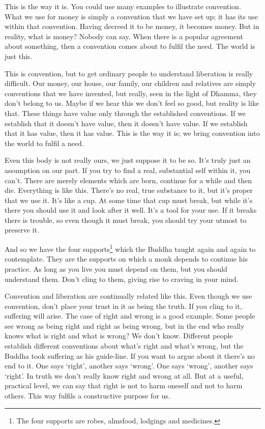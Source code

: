 This is the way it is. You could use many examples to illustrate convention. What we use for money is simply a convention that we have set up; it has its use within that convention. Having decreed it to be money, it becomes money. But in reality, what is money? Nobody can say. When there is a popular agreement about something, then a convention comes about to fulfil the need. The world is just this. 

This is convention, but to get ordinary people to understand liberation is really difficult. Our money, our house, our family, our children and relatives are simply conventions that we have invented, but really, seen in the light of Dhamma, they don't belong to us. Maybe if we hear this we don't feel so good, but reality is like that. These things have value only through the established conventions. If we establish that it doesn't have value, then it doesn't have value. If we establish that it has value, then it has value. This is the way it is; we bring convention into the world to fulfil a need. 

Even this body is not really ours, we just suppose it to be so. It's truly just an assumption on our part. If you try to find a real, substantial self within it, you can't. There are merely elements which are born, continue for a while and then die. Everything is like this. There's no real, true substance to it, but it's proper that we use it. It's like a cup. At some time that cup must break, but while it's there you should use it and look after it well. It's a tool for your use. If it breaks there is trouble, so even though it must break, you should try your utmost to preserve it. 

And so we have the four supports\footnote{The four supports are robes, almsfood, lodgings and medicines.} which the Buddha taught again and again to contemplate. They are the supports on which a monk depends to continue his practice. As long as you live you must depend on them, but you should understand them. Don't cling to them, giving rise to craving in your mind. 

Convention and liberation are continually related like this. Even though we use convention, don't place your trust in it as being the truth. If you cling to it, suffering will arise. The case of right and wrong is a good example. Some people see wrong as being right and right as being wrong, but in the end who really knows what is right and what is wrong? We don't know. Different people establish different conventions about what's right and what's wrong, but the Buddha took suffering as his guide-line. If you want to argue about it there's no end to it. One says `right', another says `wrong'. One says `wrong', another says `right'. In truth we don't really know right and wrong at all. But at a useful, practical level, we can say that right is not to harm oneself and not to harm others. This way fulfils a constructive purpose for us. 

